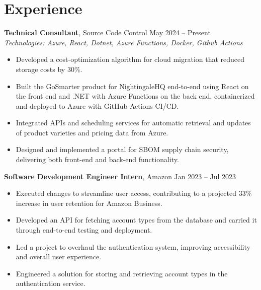 \documentclass[11pt,a4paper]{article}
\begin{document}
\section{Experience}
\textbf{Technical Consultant}, Source Code Control \hfill May 2024 -- Present
\\ \textit{Technologies: Azure, React, Dotnet, Azure Functions, Docker, Github Actions}
\begin{itemize}
  \item Developed a cost-optimization algorithm for cloud migration that reduced storage costs by 30\%.
  \item Built the GoSmarter product for NightingaleHQ end-to-end using React on the front end and .NET with Azure Functions on the back end, containerized and deployed to Azure with GitHub Actions CI/CD.
  \item Integrated APIs and scheduling services for automatic retrieval and updates of product varieties and pricing data from Azure.
  \item Designed and implemented a portal for SBOM supply chain security, delivering both front-end and back-end functionality.
\end{itemize}
\vspace{2pt}
\textbf{Software Development Engineer Intern}, Amazon \hfill Jan 2023 -- Jul 2023
\begin{itemize}
  \item Executed changes to streamline user access, contributing to a projected 33\% increase in user retention for Amazon Business.
  \item Developed an API for fetching account types from the database and carried it through end-to-end testing and deployment.
  \item Led a project to overhaul the authentication system, improving accessibility and overall user experience.
  \item Engineered a solution for storing and retrieving account types in the authentication service.
\end{itemize}
\vspace{2pt}
\end{document}
